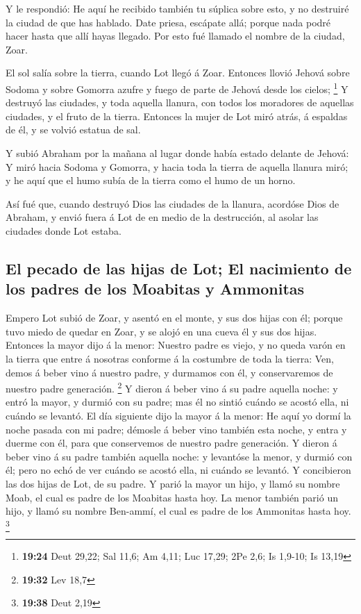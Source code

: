  Y le respondió: He aquí he recibido también tu súplica
sobre esto, y no destruiré la ciudad de que has hablado. 
Date priesa, escápate allá; porque nada podré hacer hasta que allí hayas
llegado. Por esto fué llamado el nombre de la ciudad, Zoar.

 El sol salía sobre la tierra, cuando Lot llegó á Zoar.
 Entonces llovió Jehová sobre Sodoma y sobre Gomorra
azufre y fuego de parte de Jehová desde los cielos; \footnote{\textbf{19:24}
  Deut 29,22; Sal 11,6; Am 4,11; Luc 17,29; 2Pe 2,6; Is 1,9-10; Is 13,19}
 Y destruyó las ciudades, y toda aquella llanura, con
todos los moradores de aquellas ciudades, y el fruto de la tierra.
 Entonces la mujer de Lot miró atrás, á espaldas de él, y
se volvió estatua de sal.

 Y subió Abraham por la mañana al lugar donde había
estado delante de Jehová:  Y miró hacia Sodoma y Gomorra,
y hacia toda la tierra de aquella llanura miró; y he aquí que el humo
subía de la tierra como el humo de un horno.

 Así fué que, cuando destruyó Dios las ciudades de la
llanura, acordóse Dios de Abraham, y envió fuera á Lot de en medio de la
destrucción, al asolar las ciudades donde Lot estaba.

\hypertarget{el-pecado-de-las-hijas-de-lot-el-nacimiento-de-los-padres-de-los-moabitas-y-ammonitas}{%
\subsection{El pecado de las hijas de Lot; El nacimiento de los padres
de los Moabitas y
Ammonitas}\label{el-pecado-de-las-hijas-de-lot-el-nacimiento-de-los-padres-de-los-moabitas-y-ammonitas}}

 Empero Lot subió de Zoar, y asentó en el monte, y sus
dos hijas con él; porque tuvo miedo de quedar en Zoar, y se alojó en una
cueva él y sus dos hijas.  Entonces la mayor dijo á la
menor: Nuestro padre es viejo, y no queda varón en la tierra que entre á
nosotras conforme á la costumbre de toda la tierra:  Ven,
demos á beber vino á nuestro padre, y durmamos con él, y conservaremos
de nuestro padre generación. \footnote{\textbf{19:32} Lev 18,7}
 Y dieron á beber vino á su padre aquella noche: y entró
la mayor, y durmió con su padre; mas él no sintió cuándo se acostó ella,
ni cuándo se levantó.  El día siguiente dijo la mayor á
la menor: He aquí yo dormí la noche pasada con mi padre; démosle á beber
vino también esta noche, y entra y duerme con él, para que conservemos
de nuestro padre generación.  Y dieron á beber vino á su
padre también aquella noche: y levantóse la menor, y durmió con él; pero
no echó de ver cuándo se acostó ella, ni cuándo se levantó.
 Y concibieron las dos hijas de Lot, de su padre.
 Y parió la mayor un hijo, y llamó su nombre Moab, el
cual es padre de los Moabitas hasta hoy.  La menor
también parió un hijo, y llamó su nombre Ben-ammí, el cual es padre de
los Ammonitas hasta hoy. \footnote{\textbf{19:38} Deut 2,19}

